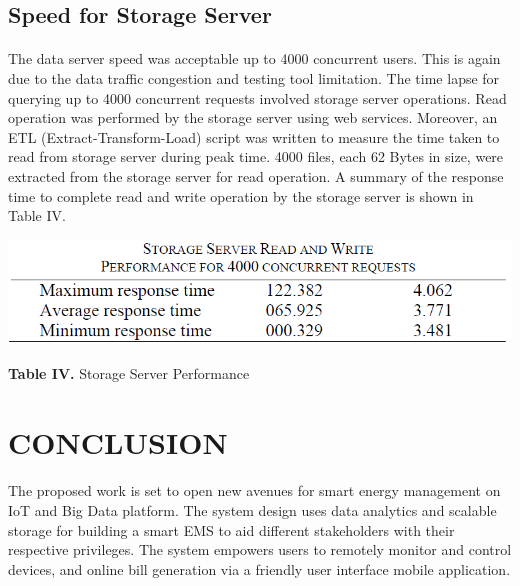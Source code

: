 \documentclass[a4paper,12pt,oneside]{article}
\let\counterwithin\relax
\begin{document}
\newpage
\subsection{Speed for Storage Server}
\paragraph{}
The data server speed was acceptable up to 4000 concurrent
users. This is again due to the data traffic congestion and
testing tool limitation. The time lapse for querying up to 4000
concurrent requests involved storage server operations. Read
operation was performed by the storage server using web
services. Moreover, an ETL (Extract-Transform-Load) script
was written to measure the time taken to read from storage
server during peak time. 4000 files, each 62 Bytes in size,
were extracted from the storage server for read operation. A
summary of the response time to complete read and write
operation by the storage server is shown in Table IV.
    \begin{table}[H]
    \includegraphics{Table4.png}
    \centering
    \caption[Storage Server Performance]{\textbf{Table IV.} Storage Server Performance}
    \end{table}

\newpage
\section{CONCLUSION}
\paragraph{}
The proposed work is set to open new avenues for smart
energy management on IoT and Big Data platform. The
system design uses data analytics and scalable storage for
building a smart EMS to aid different stakeholders with their
respective privileges. The system empowers users to remotely
monitor and control devices, and online bill generation via a
friendly user interface mobile application.

\newpage
\end{document}

